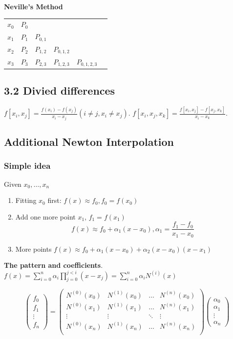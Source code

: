 \documentclass[11pt]{article}
\begin{document}
\textbf{Neville's Method}
\begin{tabular}{c c c c c c}
$x_0$ & $P_0$ &           &             &            \\
$x_1$ & $P_1$ & $P_{0,1}$ &             &            \\
$x_2$ & $P_2$ & $P_{1,2}$ & $P_{0,1,2}$ &            \\
$x_3$ & $P_3$ & $P_{2,3}$ & $P_{1,2,3}$ & $P_{0,1,2,3}$\\
\end{tabular}
\subsection{3.2 Divied differences}
\label{sec:orge4bdb2f}
\(f[x_i,x_j]=\frac{f(x_i)-f(x_j)}{x_i-x_j}(i\neq j, x_i\neq x_j)\).
\(f[x_i,x_j,x_k]=\frac{f[x_i,x_j]-f[x_j,x_k]}{x_i-x_k}\).
\subsection{Additional Newton Interpolation}
\label{sec:orgf9ad981}
\subsubsection{Simple idea}
\label{sec:org5ab95fa}
Given \(x_0,\dots,x_n\)
\begin{enumerate}
\item Fitting $x_0$ first: $f(x)\approx f_0, f_0=f(x_0)$
\item Add one more point $x_1$, $f_1=f(x_1)$
\begin{equation*}
f(x) \approx f_0+\alpha_1(x-x_0),\alpha_1=\frac{f_1-f_0}{x_1-x_0}
\end{equation*}
\item More points $f(x)\approx f_0+\alpha_1(x-x_0)+\alpha_2(x-x_0)(x-x_1)$
\end{enumerate}

\textbf{The pattern and coefficients}.
\(f(x)=\displaystyle\sum_{i=0}^n\alpha_i
    \displaystyle\prod_{j=0}^{j<i}(x-x_j)
    =\displaystyle\sum_{i=0}^n\alpha_iN^{(i)}(x)\)

\begin{equation*}
\begin{pmatrix}
f_0\\
f_1\\
\vdots\\
f_n
\end{pmatrix}=
\begin{pmatrix}
N^{(0)}(x_0) & N^{(1)}(x_0) & \dots & N^{(n)}(x_0)\\
N^{(0)}(x_1) & N^{(1)}(x_1) & \dots & N^{(n)}(x_1)\\
\vdots & \vdots & \ddots&\vdots\\
N^{(0)}(x_n) & N^{(1)}(x_n) & \dots & N^{(n)}(x_n)\\
\end{pmatrix}
\begin{pmatrix}
\alpha_0\\
\alpha_1\\
\vdots\\
\alpha_n
\end{pmatrix}
\end{equation*}
\end{document}
